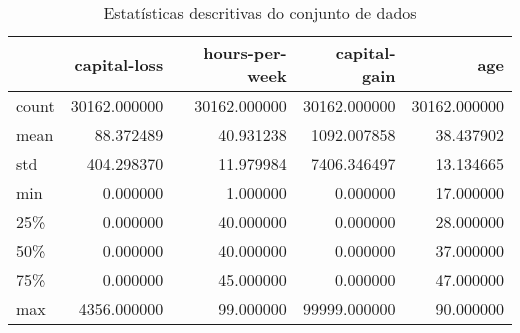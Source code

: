 \begin{table}
\centering
\caption{Estatísticas descritivas do conjunto de dados}
\label{tbl:descriptive_statistics}
\begin{tabular}{lrrrr}
\toprule
{} &  capital-loss &  hours-per-week &  capital-gain &           age \\
\midrule
count &  30162.000000 &    30162.000000 &  30162.000000 &  30162.000000 \\
mean  &     88.372489 &       40.931238 &   1092.007858 &     38.437902 \\
std   &    404.298370 &       11.979984 &   7406.346497 &     13.134665 \\
min   &      0.000000 &        1.000000 &      0.000000 &     17.000000 \\
25\%   &      0.000000 &       40.000000 &      0.000000 &     28.000000 \\
50\%   &      0.000000 &       40.000000 &      0.000000 &     37.000000 \\
75\%   &      0.000000 &       45.000000 &      0.000000 &     47.000000 \\
max   &   4356.000000 &       99.000000 &  99999.000000 &     90.000000 \\
\bottomrule
\end{tabular}
\end{table}
